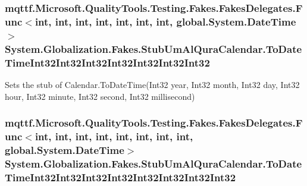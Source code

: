 \hypertarget{class_system_1_1_globalization_1_1_fakes_1_1_stub_um_al_qura_calendar_a6aa8ef32382605055624034b852dc95a}{
\subsubsection[{To\-Date\-Time\-Int32\-Int32\-Int32\-Int32\-Int32\-Int32\-Int32}]{\setlength{\rightskip}{0pt plus 5cm}mqttf.\-Microsoft.\-Quality\-Tools.\-Testing.\-Fakes.\-Fakes\-Delegates.\-Func$<$int, int, int, int, int, int, int, global.\-System.\-Date\-Time$>$ System.\-Globalization.\-Fakes.\-Stub\-Um\-Al\-Qura\-Calendar.\-To\-Date\-Time\-Int32\-Int32\-Int32\-Int32\-Int32\-Int32\-Int32}}\label{class_system_1_1_globalization_1_1_fakes_1_1_stub_um_al_qura_calendar_a6aa8ef32382605055624034b852dc95a}


Sets the stub of Calendar.\-To\-Date\-Time(\-Int32 year, Int32 month, Int32 day, Int32 hour, Int32 minute, Int32 second, Int32 millisecond)

\hypertarget{class_system_1_1_globalization_1_1_fakes_1_1_stub_um_al_qura_calendar_a3cd9200cf3b2158c0eeb42f3ab978739}{
\subsubsection[{To\-Date\-Time\-Int32\-Int32\-Int32\-Int32\-Int32\-Int32\-Int32\-Int32}]{\setlength{\rightskip}{0pt plus 5cm}mqttf.\-Microsoft.\-Quality\-Tools.\-Testing.\-Fakes.\-Fakes\-Delegates.\-Func$<$int, int, int, int, int, int, int, int, global.\-System.\-Date\-Time$>$ System.\-Globalization.\-Fakes.\-Stub\-Um\-Al\-Qura\-Calendar.\-To\-Date\-Time\-Int32\-Int32\-Int32\-Int32\-Int32\-Int32\-Int32\-Int32}}\label{class_system_1_1_globalization_1_1_fakes_1_1_stub_um_al_qura_calendar_a3cd9200cf3b2158c0eeb42f3ab978739}


